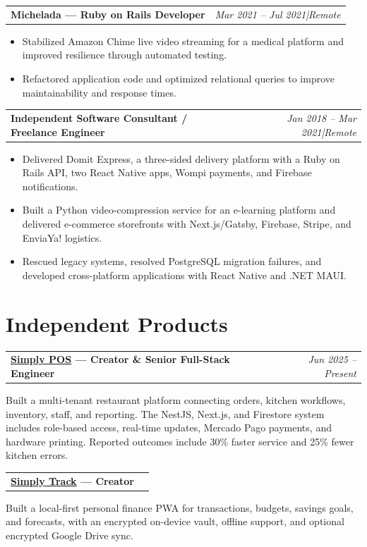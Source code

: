 \documentclass[10.5pt,a4paper]{article}
\makeatletter
\newcommand{\jobtitle}[2]{%
  \noindent
  \begin{tabularx}{\linewidth}{@{}X r@{}}
    \textbf{#1} & \textit{\small\color{muted}#2}
  \end{tabularx}\vspace{1pt}%
}
\makeatother
\begin{document}
\jobtitle{Michelada \textnormal{---} Ruby on Rails Developer}
         {Mar 2021 -- Jul 2021\enspace|\enspace Remote}
\begin{itemize}
  \item Stabilized Amazon Chime live video streaming for a medical platform and improved resilience
        through automated testing.
  \item Refactored application code and optimized relational queries to improve maintainability
        and response times.
\end{itemize}

\jobtitle{Independent Software Consultant \textnormal{/} Freelance Engineer}
         {Jan 2018 -- Mar 2021\enspace|\enspace Remote}
\begin{itemize}
  \item Delivered Domit Express, a three-sided delivery platform with a Ruby on Rails API, two
        React Native apps, Wompi payments, and Firebase notifications.
  \item Built a Python video-compression service for an e-learning platform and delivered
        e-commerce storefronts with Next.js/Gatsby, Firebase, Stripe, and EnviaYa! logistics.
  \item Rescued legacy systems, resolved PostgreSQL migration failures, and developed
        cross-platform applications with React Native and .NET MAUI.
\end{itemize}

\section{Independent Products}

\jobtitle{\href{https://simply-pos.com}{Simply POS} \textnormal{---} Creator \& Senior Full-Stack Engineer}
         {Jun 2025 -- Present}
Built a multi-tenant restaurant platform connecting orders, kitchen workflows, inventory,
staff, and reporting. The NestJS, Next.js, and Firestore system includes role-based access,
real-time updates, Mercado Pago payments, and hardware printing. Reported outcomes include
30\% faster service and 25\% fewer kitchen errors.

\jobtitle{\href{https://simply-track-one.vercel.app}{Simply Track} \textnormal{---} Creator}{}
Built a local-first personal finance PWA for transactions, budgets, savings goals, and forecasts,
with an encrypted on-device vault, offline support, and optional encrypted Google Drive sync.
\end{document}
